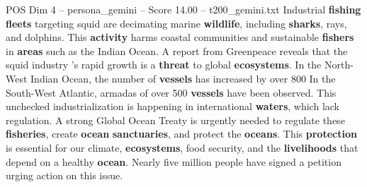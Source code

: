 \begin{textsample}{POS Dim 4 – persona\_gemini – Score 14.00 – t200\_gemini.txt}  \label{ex:f4_pos_050}
Industrial \textbf{fishing} \textbf{fleets} targeting squid are decimating marine \textbf{wildlife}, including \textbf{sharks}, rays, and dolphins.
This \textbf{activity} harms coastal communities and sustainable \textbf{fishers} in \textbf{areas} such as the Indian Ocean.
A report from Greenpeace reveals that the squid industry 's rapid growth is a \textbf{threat} to global \textbf{ecosystems}.
In the North-West Indian Ocean, the number of \textbf{vessels} has increased by over 800 %
In the South-West Atlantic, armadas of over 500 \textbf{vessels} have been observed.
This unchecked industrialization is happening in international \textbf{waters}, which lack regulation.
A strong Global Ocean Treaty is urgently needed to regulate these \textbf{fisheries}, create \textbf{ocean} \textbf{sanctuaries}, and protect the \textbf{oceans}.
This \textbf{protection} is essential for our climate, \textbf{ecosystems}, food security, and the \textbf{livelihoods} that depend on a healthy \textbf{ocean}.
Nearly five million people have signed a petition urging action on this issue.

\end{textsample}
